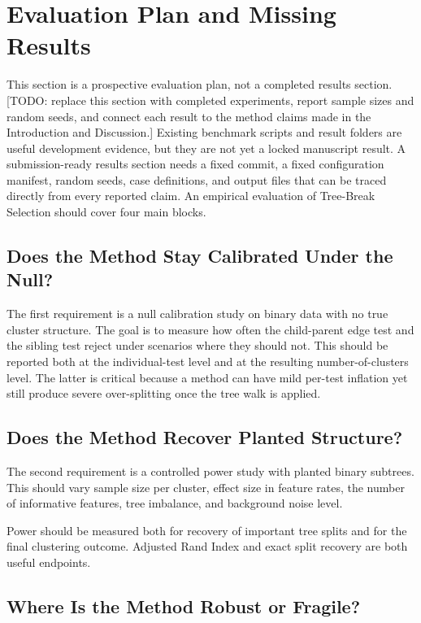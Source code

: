 
\section{Evaluation Plan and Missing Results}

This section is a prospective evaluation plan, not a completed results section.
[TODO: replace this section with completed experiments, report sample sizes and
random seeds, and connect each result to the method claims made in the
Introduction and Discussion.]
Existing benchmark scripts and result folders are useful development evidence,
but they are not yet a locked manuscript result. A submission-ready results
section needs a fixed commit, a fixed configuration manifest, random seeds,
case definitions, and output files that can be traced directly from every
reported claim.
An empirical evaluation of Tree-Break Selection should cover four main blocks.

\subsection{Does the Method Stay Calibrated Under the Null?}

The first requirement is a null calibration study on binary data with no true
cluster structure. The goal is to measure how often the child-parent edge test
and the sibling test reject under scenarios where they should not. This should
be reported both at the
individual-test level and at the resulting number-of-clusters level. The latter
is critical because a method can have mild per-test inflation yet still produce
severe over-splitting once the tree walk is applied.

\subsection{Does the Method Recover Planted Structure?}

The second requirement is a controlled power study with planted binary subtrees.
This should vary sample size per cluster, effect size in feature rates, the
number of informative features, tree imbalance, and background noise level.

Power should be measured both for recovery of important tree splits and for the
final clustering outcome. Adjusted Rand Index and exact split recovery are both
useful endpoints.

\subsection{Where Is the Method Robust or Fragile?}

